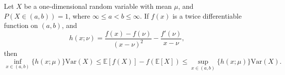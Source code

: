 \begin{theorem}\label{jensen_thm}
    Let $X$ be a one-dimensional random variable with mean $\mu$, and
    $P(X\in(a,b))=1$, where $\infty\leq a<b\leq \infty$. If $f(x)$ is a twice
    differentiable function on $(a,b)$, and
    \begin{equation}
        h(x;\nu) = \frac{f(x)-f(\nu)}{(x-\nu)^2} - \frac{f'(\nu)}{x-\nu},
    \end{equation}
    then
    \begin{equation}
        \inf_{x\in(a,b)}\{h(x;\mu)\}\mathrm{Var}(X) \leq \mathbb{E}[f(X)] -
        f(\mathbb{E}[X]) \leq \sup_{x\in(a,b)}\{ h(x;\mu) \}\mathrm{Var}(X).
    \end{equation}
\end{theorem}

